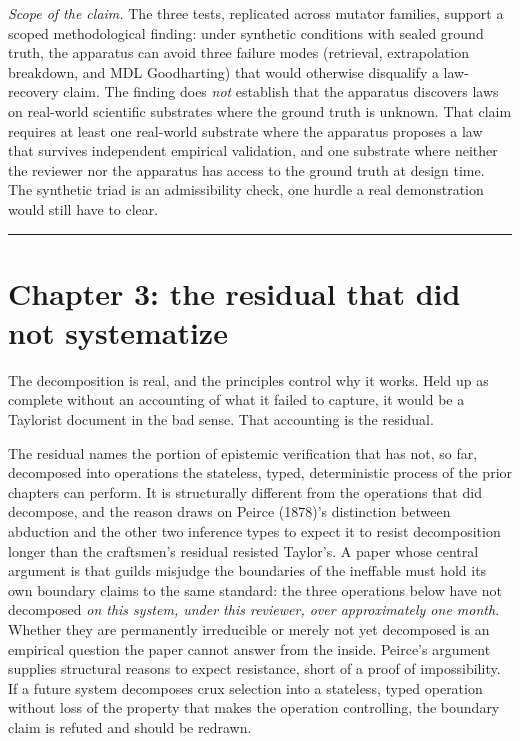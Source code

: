 \documentclass[
  11pt,
]{article}
\begin{document}
\emph{Scope of the claim.} The three tests, replicated across mutator
families, support a scoped methodological finding: under synthetic
conditions with sealed ground truth, the apparatus can avoid three failure
modes (retrieval, extrapolation breakdown, and MDL Goodharting) that would
otherwise disqualify a law-recovery claim. The finding does \emph{not}
establish that the apparatus discovers laws on real-world scientific
substrates where the ground truth is unknown. That claim requires at least
one real-world substrate where the apparatus proposes a law that survives
independent empirical validation, and one substrate where neither the
reviewer nor the apparatus has access to the ground truth at design time.
The synthetic triad is an admissibility check, one hurdle a real
demonstration would still have to clear.

\begin{center}\rule{0.5\linewidth}{0.5pt}\end{center}

\section{Chapter 3: the residual that did not
systematize}\label{chapter-3-the-residual-that-did-not-systematize}

The decomposition is real, and the principles control why it works. Held
up as complete without an accounting of what it failed to capture,
it would be a Taylorist document in the bad sense. That accounting is the
residual.

The residual names the portion of epistemic verification that has not, so
far, decomposed into operations the stateless, typed, deterministic
process of the prior chapters can perform. It is structurally different
from the operations that did decompose, and the reason draws on Peirce
(1878)'s distinction between abduction and the other two inference types
to expect it to resist decomposition longer than the craftsmen's residual
resisted Taylor's. A paper whose central argument is that guilds misjudge
the boundaries of the ineffable must hold its own boundary claims to the
same standard: the three operations below have not decomposed \emph{on
this system, under this reviewer, over approximately one month}. Whether
they are permanently irreducible or merely not yet decomposed is an
empirical question the paper cannot answer from the inside. Peirce's
argument supplies structural reasons to expect resistance, short of a
proof of impossibility. If a future system decomposes crux
selection into a stateless, typed operation without loss of the property
that makes the operation controlling, the boundary claim is refuted and
should be redrawn.
\end{document}
